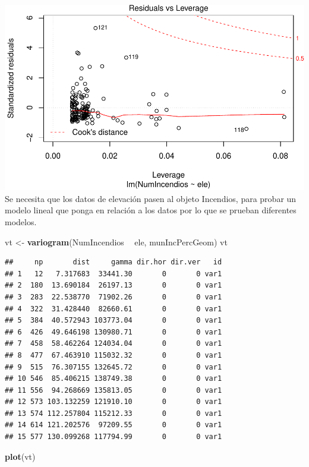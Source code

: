\documentclass[11pt,]{article}
\newenvironment{Shaded}{\begin{snugshade}}{\end{snugshade}}
\newcommand{\KeywordTok}[1]{\textcolor[rgb]{0.13,0.29,0.53}{\textbf{#1}}}
\newcommand{\StringTok}[1]{\textcolor[rgb]{0.31,0.60,0.02}{#1}}
\newcommand{\OperatorTok}[1]{\textcolor[rgb]{0.81,0.36,0.00}{\textbf{#1}}}
\newcommand{\NormalTok}[1]{#1}
\begin{document}
\includegraphics{proyecto_files/figure-latex/unnamed-chunk-54-4.pdf} Se
necesita que los datos de elevación pasen al objeto Incendios, para
probar un modelo lineal que ponga en relación a los datos por lo que se
prueban diferentes modelos.

\begin{Shaded}
\begin{Highlighting}[]
\NormalTok{vt <-}\StringTok{ }\KeywordTok{variogram}\NormalTok{(NumIncendios }\OperatorTok{~}\StringTok{ }\NormalTok{ele, munIncPercGeom)}
\NormalTok{vt}
\end{Highlighting}
\end{Shaded}

\begin{verbatim}
##     np       dist     gamma dir.hor dir.ver   id
## 1   12   7.317683  33441.30       0       0 var1
## 2  180  13.690184  26197.13       0       0 var1
## 3  283  22.538770  71902.26       0       0 var1
## 4  322  31.428440  82660.61       0       0 var1
## 5  384  40.572943 103773.04       0       0 var1
## 6  426  49.646198 130980.71       0       0 var1
## 7  458  58.462264 124034.04       0       0 var1
## 8  477  67.463910 115032.32       0       0 var1
## 9  515  76.307155 132645.72       0       0 var1
## 10 546  85.406215 138749.38       0       0 var1
## 11 556  94.268669 135813.05       0       0 var1
## 12 573 103.132259 121910.10       0       0 var1
## 13 574 112.257804 115212.33       0       0 var1
## 14 614 121.202576  97209.55       0       0 var1
## 15 577 130.099268 117794.99       0       0 var1
\end{verbatim}

\begin{Shaded}
\begin{Highlighting}[]
\KeywordTok{plot}\NormalTok{(vt)}
\end{Highlighting}
\end{Shaded}
\end{document}
